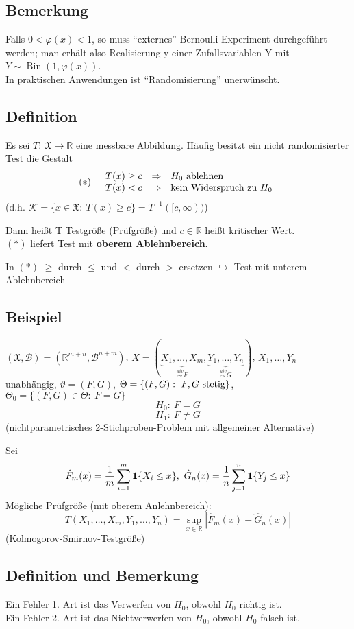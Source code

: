 \documentclass[a4paper,11pt,twoside,titlepage]{article}
\newcommand{\R}{{\mathbb R}}
\newcommand{\XX}{{\mathfrak X}} %
\newcommand{\K}{{\mathcal K}}
\newcommand\BB{ \mathcal{B} } %
\newcommand{\ind}{\text{\bf{1}}} %
\newcommand{\uiv}{\ensuremath{\stackrel{uiv}{\sim}}}
\DeclareMathOperator{\Bin}{Bin}
\begin{document}
\subsection{Bemerkung}
Falls $0<\varphi(x)<1$, so muss "`externes"' Bernoulli-Experiment durchgeführt werden; man erhält also Realisierung y einer Zufallsvariablen Y mit\\ $Y\sim\Bin(1,\varphi(x))$.\\
In praktischen Anwendungen ist "`Randomisierung"' unerwünscht.

\subsection{Definition}
Es sei $T:\ \XX\to\R$ eine messbare Abbildung. Häufig besitzt ein nicht randomisierter Test die Gestalt 
\[(\ast)\quad\begin{array}{rcl}T(x)\geq c&\Rightarrow&H_0\textnormal{ ablehnen}\\
T(x)<c&\Rightarrow&\textnormal{kein Widerspruch zu }H_0\end{array}\]
(d.h. $\K=\{x\in\XX:\ T(x)\geq c\}=T^{-1}([c,\infty))$)

Dann heißt T Testgröße (Prüfgröße) und $c\in\R$ heißt kritischer Wert.\\
$(\ast)$ liefert Test mit \textbf{oberem Ablehnbereich}.

In $(\ast)$ $\geq$ durch $\leq$ und $<$ durch $>$ ersetzen $\hookrightarrow$ Test mit unterem Ablehnbereich

\subsection{Beispiel}
$(\XX,\BB)=(\R^{m+n},\BB^{n+m})$, $X=(\underbrace{X_1,\ldots,X_m}_{\uiv F},\underbrace{Y_1,\ldots,Y_n}_{\uiv G})$, $X_1,\ldots,Y_n$\\
unabhängig, $\vartheta=(F,G)$, $\Theta=\{(F,G):\ F,G\textnormal{ stetig}\}$, $\Theta_0=\{(F,G)\in\Theta:\ F=G\}$
\[H_0:\ F=G\]
\[H_1:\ F\neq G\]
(nichtparametrisches 2-Stichproben-Problem mit allgemeiner Alternative)

Sei 
\[\hat F_m(x)=\frac1m\sum_{i=1}^m \ind\{ X_i\leq x\},\ \hat G_n(x)=\frac1n\sum_{j=1}^n \ind\{ Y_j\leq x\}\]
Mögliche Prüfgröße (mit oberem Anlehnbereich):
\[T(X_1,\ldots,X_m,Y_1,\ldots,Y_n)=\sup_{x\in\R}|\hat F_m(x)-\hat G_n(x)|\]
(Kolmogorov-Smirnov-Testgröße)

\subsection{Definition und Bemerkung}
Ein Fehler 1. Art ist das Verwerfen von $H_0$, obwohl $H_0$ richtig ist.\\
Ein Fehler 2. Art ist das Nichtverwerfen von $H_0$, obwohl $H_0$ falsch ist.
\end{document}
